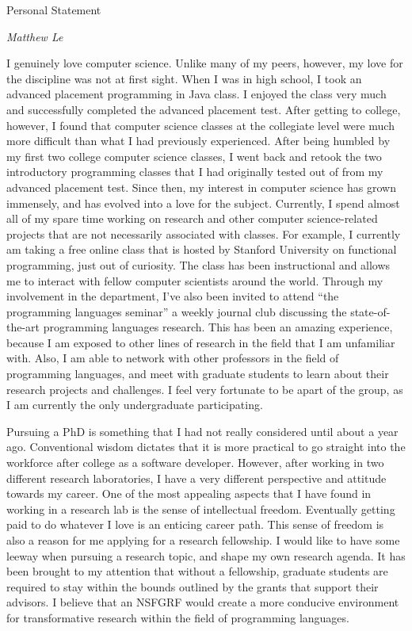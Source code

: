 \documentclass[a4paper,12pt]{article}
\begin{document}
\begin{center}
{\Large Personal Statement}

\emph{Matthew Le}
\end{center}

I genuinely love computer science. Unlike many of my peers, however, my love for the discipline was not at first sight. When I was in high school, I took an advanced placement programming in Java class. I enjoyed the class very much and successfully completed the advanced placement test. After getting to college, however, I found that computer science classes at the collegiate level were much more difficult than what I had previously experienced. After being humbled by my first two college computer science classes, I went back and retook the two introductory programming classes that I had originally tested out of from my advanced placement test. Since then, my interest in computer science has grown immensely, and has evolved into a love for the subject. Currently, I spend almost all of my spare time working on research and other computer science-related projects that are not necessarily associated with classes. For example, I currently am taking a free online class that is hosted by Stanford University on functional programming, just out of curiosity. The class has been instructional and allows me to interact with fellow computer scientists around the world. Through my involvement in the department, I've also been invited to attend ``the programming languages seminar'' a weekly journal club discussing the state-of-the-art programming languages research. This has been an amazing experience, because I am exposed to other lines of research in the field that I am unfamiliar with. Also, I am able to network with other professors in the field of programming languages, and meet with graduate students to learn about their research projects and challenges. I feel very fortunate to be apart of the group, as I am currently the only undergraduate participating.  

Pursuing a PhD is something that I had not really considered until about a year ago. Conventional wisdom dictates that it is  more practical to go straight into the workforce after college as a software developer. However, after working in two different research laboratories, I have a very different perspective and attitude towards my career. One of the most appealing aspects that I have found in working in a research lab is the sense of intellectual freedom.  Eventually getting paid to do whatever I love is an enticing career path. This sense of freedom is also a reason for me applying for a research fellowship. I would like to have some leeway when pursuing a research topic, and shape my own research agenda. It has been brought to my attention that without a fellowship, graduate students are required to stay within the bounds outlined by the grants that support their advisors. I believe that an NSFGRF would create a more conducive environment for transformative research within the field of programming languages.
\end{document}
